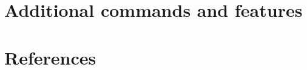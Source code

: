 \documentclass[10pt,a4paper,oneside]{book}
\begin{document}
\chapter{Additional commands and features}
\label{chap:features}


\chapter*{References}



%

%

%
\end{document}
